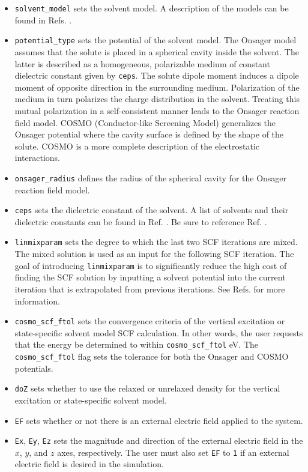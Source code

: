 \documentclass[letterpaper,12pt,titlepage]{article}
\begin{document}
\begin{itemize}
\item \verb+solvent_model+ sets the solvent model.  A description of the models can be found in Refs. \cite{bjorgaard2015solvent1,bjorgaard2015solvent2}.
\item \verb+potential_type+ sets the potential of the solvent model.  The Onsager model assumes that the solute is placed in a spherical cavity inside the solvent. The latter is described as a homogeneous, polarizable medium of constant dielectric constant given by \verb+ceps+. The solute dipole moment induces a dipole moment of opposite direction in the surrounding medium. Polarization of the medium in turn polarizes the charge distribution in the solvent. Treating this mutual polarization in a self-consistent manner leads to the Onsager reaction field model. COSMO (Conductor-like Screening Model) generalizes the Onsager potential where the cavity surface is defined by the shape of the solute.  COSMO is a more complete description of the electrostatic interactions.
\item \verb+onsager_radius+ defines the radius of the spherical cavity for the Onsager reaction field model.  
\item \verb+ceps+ sets the dielectric constant of the solvent.  A list of solvents and their dielectric constants can be found in Ref. \cite{haynes2014crc}.  Be sure to reference Ref. \cite{haynes2014crc}.
\item \verb+linmixparam+ sets the degree to which the last two SCF iterations are mixed.  The mixed solution is used as an input for the following SCF iteration.  The goal of introducing \verb+linmixparam+ is to significantly reduce the high cost of finding the SCF solution by inputting a solvent potential into the current iteration that is extrapolated from previous iterations.  See Refs. \cite{bjorgaard2015solvent1,bjorgaard2015solvent2} for more information.
\item \verb+cosmo_scf_ftol+ sets the convergence criteria of the vertical excitation or state-specific solvent model SCF calculation.  In other words, the user requests that the energy be determined to within \verb+cosmo_scf_ftol+ eV.  The \verb+cosmo_scf_ftol+ flag sets the tolerance for both the Onsager and COSMO potentials.
\item \verb+doZ+ sets whether to use the relaxed or unrelaxed density for the vertical excitation or state-specific solvent model.
\item \verb+EF+ sets whether or not there is an external electric field applied to the system.
\item \verb+Ex+, \verb+Ey+, \verb+Ez+ sets the magnitude and direction of the external electric field in the $x$, $y$, and $z$ axes, respectively.  The user must also set \verb+EF+ to \verb+1+ if an external electric field is desired in the simulation.
\end{itemize}
\end{document}
